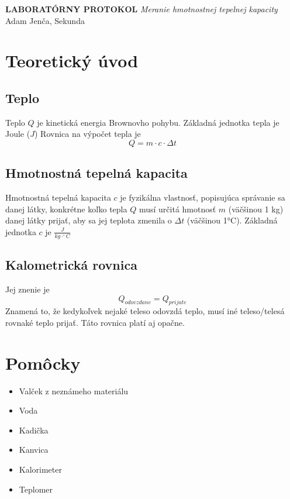 \documentclass{article}
\begin{document}
\huge
\begin{center} \textbf{LABORATÓRNY PROTOKOL}
	\vskip 0.5cm
	\textit{Meranie hmotnostnej tepelnej kapacity} 
	\vskip 1cm
	\large Adam Jenča, Sekunda 
\end{center}
\normalsize
\section{Teoretický úvod}
\subsection{Teplo}
Teplo $Q$ je kinetická energia Brownovho pohybu.
Základná jednotka tepla je Joule ($J$)
Rovnica na výpočet tepla je 
	\[
		Q = m \cdot c \cdot \Delta t
	\]
\subsection{Hmotnostná tepelná kapacita}
Hmotnostná tepelná kapacita $c$ je fyzikálna vlastnosť, popisujúca správanie sa danej látky, konkrétne koľko tepla $Q$ musí určitá hmotnosť $m$ (väčšinou 1 kg) danej látky prijať, aby sa jej teplota zmenila o $\Delta t$ (väčšinou 1°C).
Základná jednotka $c$ je $\frac{J}{kg \cdot ^{\circ} C}$

\subsection{Kalometrická rovnica}
Jej znenie je \[
	Q_{odovzdane} = Q_{prijate}
\]
Znamená to, že kedykoľvek nejaké teleso odovzdá teplo, musí iné teleso/telesá rovnaké teplo prijať.
Táto rovnica platí aj opačne.
\section{Pomôcky}
\begin{itemize}
\item Valček z neznámeho materiálu
\item Voda
\item Kadička
\item Kanvica
\item Kalorimeter
\item Teplomer
\end{itemize}
\end{document}
